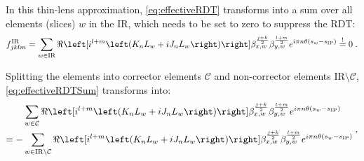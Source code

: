 In this thin-lens approximation, \cref{eq:effectiveRDT} transforms into a sum over all elements (slices) $w$ in the IR, 
which needs to be set to zero to suppress the RDT:
\begin{equation}
    \label{eq:effectiveRDTSum}
    f^\text{IR}_{jklm} =  \sum\limits_{w \in \text{IR}} 
    \ReOf{    
     i^{l+m}
     \left(K_{n}L_w + iJ_{n}L_w \right) 
    }
        \beta_{x,w}^{\frac{j+k}{2}}
        \beta_{y,w}^{\frac{l+m}{2}} 
     e^{i \pi n \theta(s_w - s_\text{IP})} 
     \overeq{!} 0 
     \; .
\end{equation}
%

Splitting the elements into corrector elements $\mathcal{C}$ and non-corrector elements $\text{IR}\setminus\mathcal{C}$,
\cref{eq:effectiveRDTSum} transforms into:
\begin{equation}
    \label{eq:equationSum}
    \begin{split}
    &\sum\limits_{w \in \mathcal{C}} 
    \ReOf{    
     i^{l+m}
     \left(K_{n}L_w + iJ_{n}L_w \right) 
    }
        \beta_{x,w}^{\frac{j+k}{2}}
        \beta_{y,w}^{\frac{l+m}{2}} 
     e^{i \pi n \theta(s_w - s_\text{IP})} \\
     = 
    -&\sum\limits_{w \in \text{IR}\setminus\mathcal{C}} 
    \ReOf{  
     i^{l+m}
     \left(K_{n}L_w + iJ_{n}L_w \right) 
    }
        \beta_{x,w}^{\frac{j+k}{2}}
        \beta_{y,w}^{\frac{l+m}{2}} 
     e^{i \pi n \theta(s_w - s_\text{IP})} 
    \end{split}
     \; ,
\end{equation}


